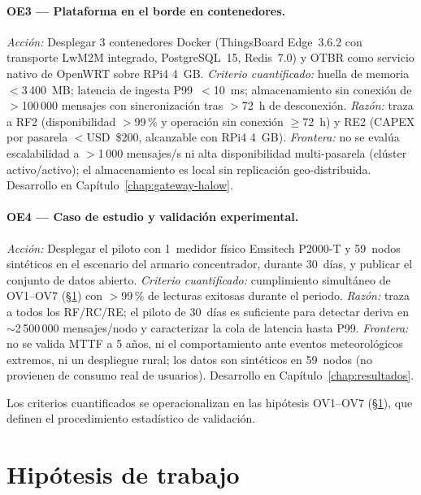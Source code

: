 \paragraph{OE3 --- Plataforma en el borde en contenedores.}
\textit{Acción:} Desplegar 3 contenedores Docker (ThingsBoard Edge~3.6.2 con transporte LwM2M integrado, PostgreSQL~15, Redis~7.0) y OTBR como servicio nativo de OpenWRT sobre RPi4 4~GB.
\textit{Criterio cuantificado:} huella de memoria $<$3\,400~MB; latencia de ingesta P99~$<$10~ms; almacenamiento sin conexión de $>$100\,000 mensajes con sincronización tras $>$72~h de desconexión.
\textit{Razón:} traza a RF2 (disponibilidad $>$99\,\% y operación sin conexión $\geq$72~h) y RE2 (CAPEX por pasarela $<$USD~\$200, alcanzable con RPi4 4~GB).
\textit{Frontera:} no se evalúa escalabilidad a $>$1\,000 mensajes/s ni alta disponibilidad multi-pasarela (clúster activo/activo); el almacenamiento es local sin replicación geo-distribuida. Desarrollo en Capítulo~\ref{chap:gateway-halow}.

\paragraph{OE4 --- Caso de estudio y validación experimental.}
\textit{Acción:} Desplegar el piloto con 1~medidor físico Emsitech P2000-T y 59~nodos sintéticos en el escenario del armario concentrador, durante 30~días, y publicar el conjunto de datos abierto.
\textit{Criterio cuantificado:} cumplimiento simultáneo de OV1--OV7 (§\ref{sec:hipotesis}) con $>$99\,\% de lecturas exitosas durante el periodo.
\textit{Razón:} traza a todos los RF/RC/RE; el piloto de 30~días es suficiente para detectar deriva en $\sim$2\,500\,000 mensajes/nodo y caracterizar la cola de latencia hasta P99.
\textit{Frontera:} no se valida MTTF a 5 años, ni el comportamiento ante eventos meteorológicos extremos, ni un despliegue rural; los datos son sintéticos en 59~nodos (no provienen de consumo real de usuarios). Desarrollo en Capítulo~\ref{chap:resultados}.

Los criterios cuantificados se operacionalizan en las hipótesis OV1--OV7 (§\ref{sec:hipotesis}), que definen el procedimiento estadístico de validación.


\section{Hipótesis de trabajo}
\label{sec:hipotesis}

